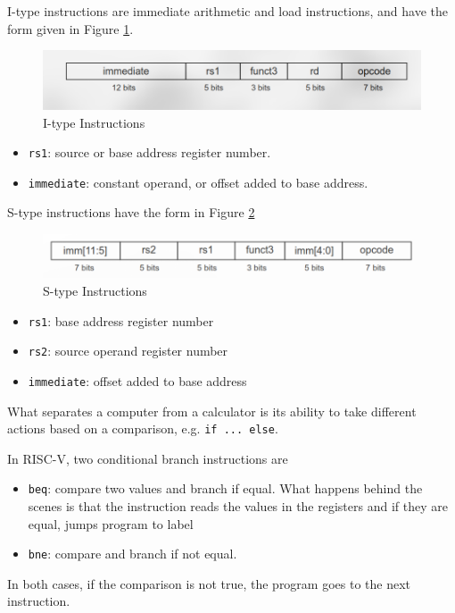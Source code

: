 I-type instructions are immediate arithmetic
and load instructions, and have the form given
in Figure \ref{fig:itype}.
\begin{figure}
    \includegraphics{images/itype.png}
    \caption{I-type Instructions}
    \label{fig:itype}
\end{figure}
\begin{itemize}
    \item \texttt{rs1}: source or base address register number.
    \item \texttt{immediate}: constant operand, or offset added to base address.
\end{itemize}

S-type instructions have the form in
Figure \ref{fig:stype}
\begin{figure}
    \includegraphics{images/stype.png}
    \caption{S-type Instructions}
    \label{fig:stype}
\end{figure}
\begin{itemize}
    \item \texttt{rs1}: base address register number
    \item \texttt{rs2}: source operand register number
    \item \texttt{immediate}: offset added to base address
\end{itemize}

What separates a computer from a calculator is its ability
to take different actions based on a comparison, e.g. \texttt{if ... else}.

In RISC-V, two conditional branch instructions are
\begin{itemize}
    \item \texttt{beq}: compare two values and branch if equal. What
          happens behind the scenes is that the instruction
          reads the values in the registers and if they are
          equal, jumps program to label
    \item \texttt{bne}: compare and branch if not equal.
\end{itemize}
In both cases, if the comparison is not
true, the program goes to the next instruction.

